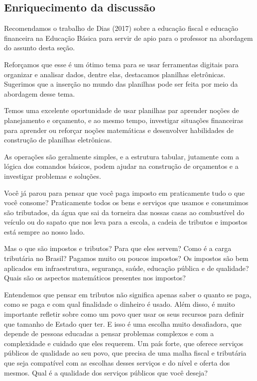 \begin{paginatexto2}
\section*{Enriquecimento da discussão}

Recomendamos o trabalho de Dias (2017) sobre a educação fiscal e educação financeira na Educação Básica para servir de apio para o professor na abordagem do assunto desta seção.

Reforçamos que esse é um ótimo tema para se usar ferramentas digitais para organizar e analisar dados, dentre elas, destacamos planilhas eletrônicas. Sugerimos que a inserção no mundo das planilhas pode ser feita por meio da abordagem desse tema.

Temos uma excelente oportunidade de usar planilhas par aprender noções de planejamento e orçamento, e ao mesmo tempo, investigar situações financeiras para aprender ou reforçar noções matemáticas e desenvolver habilidades de construção de planilhas eletrônicas.

As operações são geralmente simples, e a estrutura tabular, jutamente com a lógica dos comandos básicos, podem ajudar na construção de orçamentos e a investigar problemas e soluções.
\end{paginatexto2}

Você já parou para pensar que você paga imposto em praticamente tudo o que você consome? Praticamente todos os bens e serviços que usamos e consumimos são tributados, da água que sai da torneira das nossas casas ao combustível do veículo ou do sapato que nos leva para a escola, a cadeia de tributos e impostos está sempre ao nosso lado.

Mas o que são impostos e tributos? Para que eles servem? Como é a carga tributária no Brasil? Pagamos muito ou poucos impostos? Os impostos são bem aplicados em infraestrutura, segurança, saúde, educação pública e de qualidade? Quais são os aspectos matemáticos presentes nos impostos?

Entendemos que pensar em tributos não significa apenas saber o quanto se paga, como se paga e com qual finalidade o dinheiro é usado. Além disso, é muito importante refletir sobre como um povo quer usar os seus recursos para definir que tamanho de Estado quer ter. E isso é uma escolha muito desafiadora, que depende de pessoas educadas a pensar problemas complexos e com a complexidade e cuidado que eles requerem. Um país forte, que oferece serviços públicos de qualidade ao seu povo, que precisa de uma malha fiscal e tributária que seja compatível com as escolhas desses serviços e do nível e oferta dos mesmos. Qual é a qualidade dos serviços públicos que você deseja?

